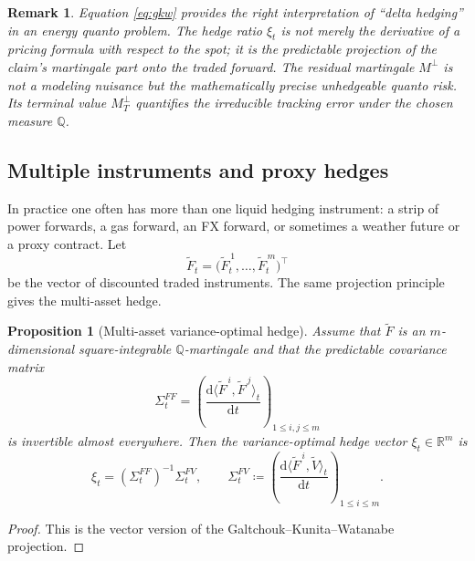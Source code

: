 \documentclass[10pt,a4paper,reqno]{amsart}
\newtheorem{proposition}[theorem]{Proposition}
\newtheorem{remark}[theorem]{Remark}
\newcommand{\R}{\mathbb{R}}
\newcommand{\Q}{\mathbb{Q}}
\newcommand{\1}{\mathbbm{1}}
\newcommand{\dd}{\mathrm{d}}
\begin{document}
\begin{remark}
Equation \eqref{eq:gkw} provides the right interpretation of ``delta hedging''
in an energy quanto problem. The hedge ratio \(\xi_t\) is not merely the
derivative of a pricing formula with respect to the spot; it is the predictable
projection of the claim's martingale part onto the traded forward. The residual
martingale \(M^{\perp}\) is not a modeling nuisance but the mathematically
precise unhedgeable quanto risk. Its terminal value \(M^{\perp}_T\) quantifies
the irreducible tracking error under the chosen measure \(\Q\).
\end{remark}

\subsection{Multiple instruments and proxy hedges}

In practice one often has more than one liquid hedging instrument: a strip of
power forwards, a gas forward, an FX forward, or sometimes a weather future or a
proxy contract. Let
\[
\widetilde{F}_t = \big(\widetilde{F}_t^{\,1},\dots,\widetilde{F}_t^{\,m}\big)^\top
\]
be the vector of discounted traded instruments. The same projection principle
gives the multi-asset hedge.

\begin{proposition}[Multi-asset variance-optimal hedge]
\label{prop:multi_hedge}
Assume that \(\widetilde{F}\) is an \(m\)-dimensional square-integrable
\(\Q\)-martingale and that the predictable covariance matrix
\[
\Sigma_t^{FF}
= \left(
    \frac{\dd \langle \widetilde{F}^{\,i},\widetilde{F}^{\,j}\rangle_t}{\dd t}
  \right)_{1 \le i,j \le m}
\]
is invertible almost everywhere. Then the variance-optimal hedge vector
\(\xi_t \in \R^m\) is
\begin{equation}\label{eq:multi_hedge}
  \xi_t
  = (\Sigma_t^{FF})^{-1} \Sigma_t^{FV},
  \qquad
  \Sigma_t^{FV}
  \coloneqq \left(
    \frac{\dd \langle \widetilde{F}^{\,i},\widetilde{V}\rangle_t}{\dd t}
  \right)_{1 \le i \le m}.
\end{equation}
\end{proposition}

\begin{proof}
This is the vector version of the Galtchouk--Kunita--Watanabe projection.
\end{proof}
\end{document}
